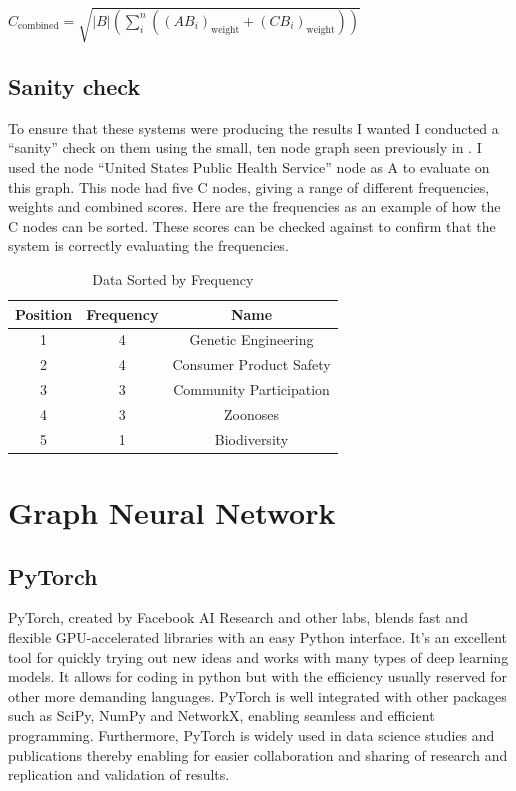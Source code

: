 \documentclass{l4proj}
\begin{document}
\begin{center}
    $C_{\text{combined}} = \sqrt{|B|(\sum_i^n ((AB_i)_{\text{weight}} + (CB_i)_{\text{weight}}))}$\\
\end{center}

\subsection{Sanity check}

To ensure that these systems were producing the results I wanted I conducted a ``sanity'' check on them using the small, ten node graph seen previously in . I used the node ``United States Public Health Service'' node as A to evaluate on this graph. This node had five C nodes, giving a range of different frequencies, weights and combined scores. Here are the frequencies as an example of how the C nodes can be sorted. These scores can be checked against  to confirm that the system is correctly evaluating the frequencies.\\

\begin{table}[h]
\centering
\caption{Data Sorted by Frequency}
\begin{tabular}{|c|c|c|}
\hline
\textbf{Position} & \textbf{Frequency} & \textbf{Name} \\ \hline
1 & 4 & Genetic Engineering \\ \hline
2 & 4 & Consumer Product Safety \\ \hline
3 & 3 & Community Participation \\ \hline
4 & 3 & Zoonoses \\ \hline
5 & 1 & Biodiversity \\ \hline
\end{tabular}
\end{table}

\section{Graph Neural Network}

\subsection{PyTorch}

PyTorch, created by Facebook AI Research and other labs, blends fast and flexible GPU-accelerated libraries with an easy Python interface. It's an excellent tool for quickly trying out new ideas and works with many types of deep learning models. It allows for coding in python but with the efficiency usually reserved for other more demanding languages. PyTorch is well integrated with other packages such as SciPy, NumPy and NetworkX, enabling seamless and efficient programming. Furthermore, PyTorch is widely used in data science studies and publications thereby enabling for easier collaboration and sharing of research and replication and validation of results. \\
\end{document}
